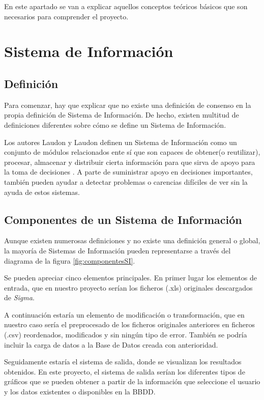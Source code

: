 
En este apartado se van a explicar aquellos conceptos teóricos básicos que son necesarios para comprender el proyecto.

\section{Sistema de Información}

\subsection{Definición}

Para comenzar, hay que explicar que no existe una definición de consenso en la propia definición de Sistema de Información. De hecho, existen multitud de definiciones diferentes sobre cómo se define un Sistema de Información.

Los autores Laudon y Laudon definen un Sistema de Información como un conjunto de módulos relacionados ente sí que son capaces de obtener(o reutilizar), procesar, almacenar y distribuir cierta información para que sirva de apoyo para la toma de decisiones \cite{vicen}.
A parte de suministrar apoyo en decisiones importantes, también pueden ayudar a detectar problemas o carencias difíciles de ver sin la ayuda de estos sistemas.

\subsection{Componentes de un Sistema de Información}
Aunque existen numerosas definiciones y no existe una definición general o global, la mayoría de Sistemas de Información pueden representarse a través del diagrama de la figura \ref{fig:componentesSI}.



Se pueden apreciar cinco elementos principales. En primer lugar los elementos de entrada, que en nuestro proyecto serían los ficheros (.xls) originales descargados de \emph{Sigma}. 

A continuación estaría un elemento de modificación o transformación, que en nuestro caso sería el preprocesado de los ficheros originales anteriores en ficheros (.csv) reordenados, modificados y sin ningún tipo de error. También se podría incluir la carga de datos a la Base de Datos creada con anterioridad.

Seguidamente estaría el sistema de salida, donde se visualizan los resultados obtenidos. En este proyecto, el sistema de salida serían los diferentes tipos de gráficos que se pueden obtener a partir de la información que seleccione el usuario y los datos existentes o disponibles en la BBDD.

